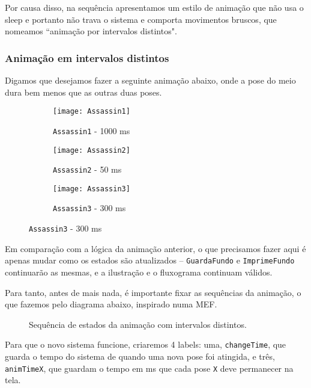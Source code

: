 \documentclass[10pt, a4paper, twoside]{article}
\begin{document}
            Por causa disso, na sequência apresentamos um estilo de animação que não usa o sleep e portanto não trava o sistema e comporta movimentos bruscos, que nomeamos ``animação por intervalos distintos".
        
        \subsubsection{Animação em intervalos distintos}
            Digamos que desejamos fazer a seguinte animação abaixo, onde a pose do meio dura bem menos que as outras duas poses.
            \begin{figure}[H]\centering
                \caption{Sprites a serem animadas e suas durações}
                \begin{subfigure}{0.32\textwidth}
                    \centering
                    \caption{{\tt Assassin1} - 1000 ms}
                    \texttt{[image: Assassin1]}
                \end{subfigure}
                \begin{subfigure}{0.32\textwidth}
                    \centering
                    \caption{{\tt Assassin2} - 50 ms}
                    \texttt{[image: Assassin2]}
                \end{subfigure}
                \begin{subfigure}{0.32\textwidth}
                    \centering
                    \caption{{\tt Assassin3} - 300 ms}
                    \texttt{[image: Assassin3]}
                \end{subfigure}
            \end{figure}
            Em comparação com a lógica da animação anterior, o que precisamos fazer aqui é apenas mudar como os estados são atualizados -- {\tt GuardaFundo} e {\tt ImprimeFundo} continuarão as mesmas, e a ilustração e o fluxograma continuam válidos.
            
            Para tanto, antes de mais nada, é importante fixar as sequências da animação, o que fazemos pelo diagrama abaixo, inspirado numa MEF.
            \begin{figure}[H]\centering
                \caption{Sequência de estados da animação com intervalos distintos.}
                
            \end{figure}
            Para que o novo sistema funcione, criaremos 4 labels:
            uma, {\tt changeTime}, que guarda o tempo do sistema de quando uma nova pose foi atingida, e três, {\tt animTimeX}, que guardam o tempo em ms que cada pose {\tt X} deve permanecer na tela.
            
\end{document}
